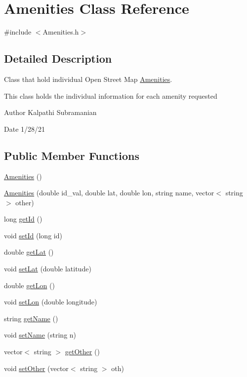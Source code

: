 \hypertarget{class_amenities}{}\section{Amenities Class Reference}
\label{class_amenities}


{\ttfamily \#include $<$Amenities.\+h$>$}



\subsection{Detailed Description}
Class that hold individual Open Street Map \hyperlink{class_amenities}{Amenities}. 

This class holds the individual information for each amenity requested

\begin{DoxyAuthor}{Author}
Kalpathi Subramanian 
\end{DoxyAuthor}
\begin{DoxyDate}{Date}
1/28/21 
\end{DoxyDate}
\subsection*{Public Member Functions}
\begin{DoxyCompactItemize}
\item 
\hyperlink{class_amenities_aaca35070dbce088a362bed65da3948b5}{Amenities} ()
\item 
\hyperlink{class_amenities_ab0d42e0e00b08384bbb464450d9d2fca}{Amenities} (double id\+\_\+val, double lat, double lon, string name, vector$<$ string $>$ other)
\item 
long \hyperlink{class_amenities_aadb0f5678804b68404611afbb09ba20e}{get\+Id} ()
\item 
void \hyperlink{class_amenities_a69f80fffcfde16620ff7d56a33c878c9}{set\+Id} (long id)
\item 
double \hyperlink{class_amenities_a5e0767560a831dd7ffdf033cfa335189}{get\+Lat} ()
\item 
void \hyperlink{class_amenities_ae32b353ad67e770da79a4aefc493cf6b}{set\+Lat} (double latitude)
\item 
double \hyperlink{class_amenities_ac1e4e374a7da9bafb76db8a36de3640a}{get\+Lon} ()
\item 
void \hyperlink{class_amenities_a4452e6a8ec7e1f4d7b84307a75572ce2}{set\+Lon} (double longitude)
\item 
string \hyperlink{class_amenities_a9733cccc5b0e5ffaf76d96b414a5c5f2}{get\+Name} ()
\item 
void \hyperlink{class_amenities_a71fd6a4f051daf3365b6dd78c4ef7ea6}{set\+Name} (string n)
\item 
vector$<$ string $>$ \hyperlink{class_amenities_ad160432cc2dc13c82d7fd88019a95864}{get\+Other} ()
\item 
void \hyperlink{class_amenities_a97c54a9e60bc8016055963f0ce1a08f0}{set\+Other} (vector$<$ string $>$ oth)
\end{DoxyCompactItemize}


